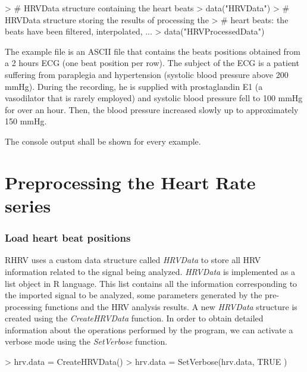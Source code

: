 \documentclass[12pt,lot, lof]{puthesis}
\begin{document}
\begin{Schunk}
\begin{Sinput}
> # HRVData structure containing the heart beats 
> data("HRVData")
> # HRVData structure storing the results of processing the 
> # heart beats: the beats have been filtered, interpolated, ... 
> data("HRVProcessedData")
\end{Sinput}
\end{Schunk}
The example file is an ASCII file that contains the beats positions obtained 
from a 2 hours \gls{ECG} (one beat position per row). The subject of the 
\gls{ECG} is a patient suffering from paraplegia and hypertension (systolic 
blood pressure above 200 mmHg).  During the recording, he is supplied with 
prostaglandin E1 (a vasodilator that is rarely employed) and systolic blood 
pressure fell to 100 mmHg for over an hour. Then, the blood pressure increased 
slowly up to approximately
 150 mmHg. 

The console output shall be shown for every example.
\section{Preprocessing the Heart Rate series\label{sec:quickPrep}}
\subsubsection{Load heart beat positions} RHRV uses a custom data structure 
called \textit{HRVData} to store all HRV information related to the signal 
being analyzed. \textit{HRVData} is implemented as a list object in R language. 
This list contains all the information corresponding
to the imported signal to be analyzed, some parameters generated
by the pre-processing functions and the HRV analysis results.  A new 
\textit{HRVData} structure is created using the \textit{CreateHRVData} 
function. In order to obtain detailed information about
the operations performed by the program, we can activate a verbose mode using 
the \textit{SetVerbose} function.
\begin{Schunk}
\begin{Sinput}
> hrv.data  = CreateHRVData()
> hrv.data = SetVerbose(hrv.data, TRUE )
\end{Sinput}
\end{Schunk}
\end{document}
